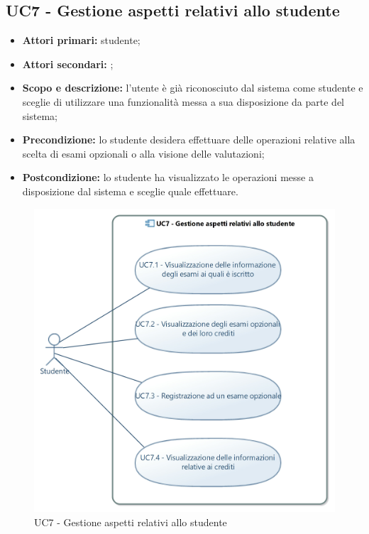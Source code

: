 \documentclass[AnalisiDeiRequisiti.tex]{subfiles}
\begin{document}
\subsection{UC7 - Gestione aspetti relativi allo studente}
\begin{itemize}
	\item \textbf{Attori primari:} studente;\\
	\item \textbf{Attori secondari:} ;
	\item \textbf{Scopo e descrizione:} l'utente è già riconosciuto dal sistema come studente e sceglie di utilizzare una funzionalità messa a sua disposizione da parte del sistema;\\
	\item \textbf{Precondizione:} lo studente desidera effettuare delle operazioni relative alla scelta di esami opzionali o alla visione delle valutazioni;\\
	\item \textbf{Postcondizione:} lo studente ha visualizzato le operazioni messe a disposizione dal sistema e sceglie quale effettuare.\\
\end{itemize}

\begin{figure}[H]
	\centering
	\includegraphics[width=0.8\linewidth]{UC7.jpg}
	\caption{UC7 - Gestione aspetti relativi allo studente}
	\label{fig:UC7 - Gestione aspetti relativi allo studente}
\end{figure}
\end{document}
